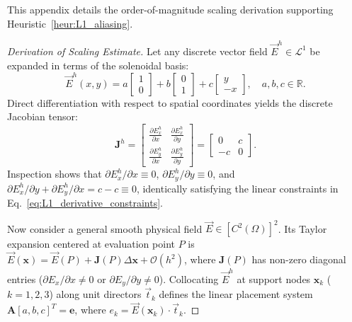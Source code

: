 \documentclass[preprint,12pt]{elsarticle}
\begin{document}
This appendix details the order-of-magnitude scaling derivation supporting Heuristic~\ref{heur:L1_aliasing}.

\begin{proof}[Derivation of Scaling Estimate]
    Let any discrete vector field $\vec{E}^h \in \mathcal{L}^1$ be expanded in terms of the solenoidal basis:
    \begin{equation}
        \vec{E}^h(x, y) = a \begin{bmatrix} 1 \\ 0 \end{bmatrix} + b \begin{bmatrix} 0 \\ 1 \end{bmatrix} + c \begin{bmatrix} y \\ -x \end{bmatrix}, \quad a, b, c \in \mathbb{R}.
    \end{equation}
    Direct differentiation with respect to spatial coordinates yields the discrete Jacobian tensor:
    \begin{equation}
        \mathbf{J}^h = \begin{bmatrix}
            \frac{\partial E_x^h}{\partial x} & \frac{\partial E_x^h}{\partial y} \\[4pt]
            \frac{\partial E_y^h}{\partial x} & \frac{\partial E_y^h}{\partial y}
        \end{bmatrix} = \begin{bmatrix}
            0  & c \\
            -c & 0
        \end{bmatrix}.
    \end{equation}
    Inspection shows that $\partial E_x^h/\partial x \equiv 0$, $\partial E_y^h/\partial y \equiv 0$, and $\partial E_x^h/\partial y + \partial E_y^h/\partial x = c - c \equiv 0$, identically satisfying the linear constraints in Eq.~\eqref{eq:L1_derivative_constraints}.

    Now consider a general smooth physical field $\vec{E} \in [C^2(\Omega)]^2$. Its Taylor expansion centered at evaluation point $P$ is $\vec{E}(\mathbf{x}) = \vec{E}(P) + \mathbf{J}(P) \Delta\mathbf{x} + \mathcal{O}(h^2)$, where $\mathbf{J}(P)$ has non-zero diagonal entries ($\partial E_x/\partial x \neq 0$ or $\partial E_y/\partial y \neq 0$). Collocating $\vec{E}^h$ at support nodes $\mathbf{x}_k$ ($k=1,2,3$) along unit directors $\vec{t}_k$ defines the linear placement system $\mathbf{A} [a, b, c]^T = \mathbf{e}$, where $e_k = \vec{E}(\mathbf{x}_k) \cdot \vec{t}_k$.


\end{proof}
\end{document}
